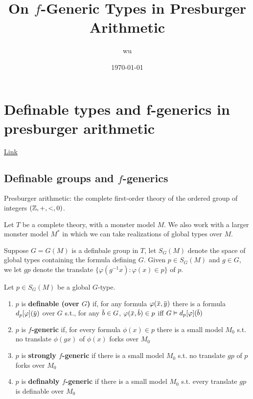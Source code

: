 \documentclass[11pt]{article}
\author{wu}
\date{\today}
\title{On \(f\)-Generic Types in Presburger Arithmetic}
\begin{document}
\maketitle
\tableofcontents

\section{Definable types and f-generics in presburger arithmetic}
\label{sec:org065fcce}
\href{https://people.math.osu.edu/conant.38/Math/presburger\_note.pdf}{Link}
\subsection{Definable groups and \texorpdfstring{\(f\)}{f}-generics}
\label{sec:org0c9c74b}
Presburger arithmetic: the complete first-order theory of the ordered group of
integers \((\mathbb{Z},+,<,0)\).

Let \(T\) be a complete theory, with a monster model \(M\). We also work with a larger monster
model \(M^*\) in which we can take realizations of global types over \(M\).

Suppose \(G=G(M)\) is a definbale group in \(T\), let \(S_G(M)\) denote the space of global
types containing the formula defining \(G\). Given \(p\in S_G(M)\) and \(g\in G\), we let \(gp\)
denote the translate \(\{\varphi(g^{-1}x):\varphi(x)\in p\}\) of \(p\).

\begin{definition}[]
Let \(p\in S_G(M)\) be a global \(G\)-type.
\begin{enumerate}
\item \(p\) is \textbf{definable (over \(G\))} if, for any formula \(\varphi(\barx,\bary)\) there is a
formula \(d_p[\varphi](\bary)\) over \(G\) s.t., for any \(\barb\in G\), \(\varphi(\barx,\barb)\in p\)
iff \(G\vDash d_p[\varphi](\barb)\)
\item \(p\) is \textbf{\(f\)-generic} if, for every formula \(\phi(x)\in p\) there is a small
model \(M_0\) s.t. no translate \(\phi(gx)\) of \(\phi(x)\) forks over \(M_0\)
\item \(p\) is \textbf{strongly \(f\)-generic} if there is a small model \(M_0\) s.t. no translate \(gp\)
of \(p\) forks over \(M_0\)
\item \(p\) is \textbf{definably \(f\)-generic} if there is a small model \(M_0\) s.t. every translate
\(gp\) is definable over \(M_0\)
\end{enumerate}
\end{definition}
\end{document}
